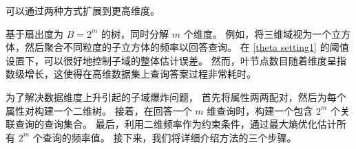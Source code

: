 \myahead 可以通过两种方式扩展到更高维度。

基于扇出度为 $B=2^m$ 的树，\myahead 同时分解 $m$ 个维度。
例如，\myahead 将三维域视为一个立方体，然后聚合不同粒度的子立方体的频率以回答查询。
在 \autoref{theta setting1} 的阈值设置下，\myahead 可以很好地控制子域的整体估计误差。
然而，叶节点数目随着维度呈指数级增长，这使得在高维数据集上查询答案过程非常耗时。

为了解决数据维度上升引起的子域爆炸问题，
\lle 首先将属性两两配对，然后为每个属性对构建一个二维\myahead 树。
接着，在回答一个 $m$ 维查询时，\lle 构建一个包含 $2^m$ 个关联查询的查询集合。
最后，利用二维频率作为约束条件，\lle 通过最大熵优化估计所有 $2^m$ 个查询的频率值。
接下来，我们将详细介绍\lle 方法的三个步骤。
